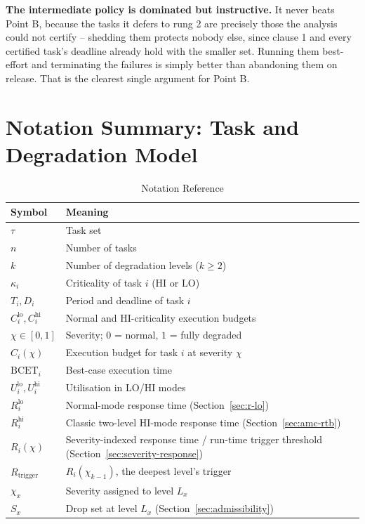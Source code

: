 \textbf{The intermediate policy is dominated but instructive.} It never beats
Point B, because the tasks it defers to rung 2 are precisely those the analysis
could not certify -- shedding them protects nobody else, since clause 1 and
every certified task's deadline already hold with the smaller set. Running them
best-effort and terminating the failures is simply better than abandoning them
on release. That is the clearest single argument for Point B.

\section{Notation Summary: Task and Degradation Model}
\label{sec:notation-task-model}

\begin{table}[h]
\centering
\caption{Notation Reference}
\begin{tabular}{ll}
\toprule
Symbol & Meaning \\
\midrule
$\tau$ & Task set \\
$n$ & Number of tasks \\
$k$ & Number of degradation levels ($k \geq 2$) \\
$\kappa_i$ & Criticality of task $i$ ($\mathrm{HI}$ or $\mathrm{LO}$) \\
$T_i, D_i$ & Period and deadline of task $i$ \\
$C_i^{\mathrm{lo}}, C_i^{\mathrm{hi}}$ & Normal and HI-criticality execution budgets \\
$\chi \in [0,1]$ & Severity; $0$ = normal, $1$ = fully degraded \\
$C_i(\chi)$ & Execution budget for task $i$ at severity $\chi$ \\
$\mathrm{BCET}_i$ & Best-case execution time \\
$U_i^{\mathrm{lo}}, U_i^{\mathrm{hi}}$ & Utilisation in LO/HI modes \\
$R_i^{\mathrm{lo}}$ & Normal-mode response time (Section~\ref{sec:r-lo}) \\
$R_i^{\mathrm{hi}}$ & Classic two-level HI-mode response time (Section~\ref{sec:amc-rtb}) \\
$R_i(\chi)$ & Severity-indexed response time / run-time trigger threshold (Section~\ref{sec:severity-response}) \\
$R_{\mathrm{trigger}}$ & $R_i(\chi_{k-1})$, the deepest level's trigger \\
$\chi_x$ & Severity assigned to level $L_x$ \\
$S_x$ & Drop set at level $L_x$ (Section~\ref{sec:admissibility}) \\

\end{tabular}
\end{table}
